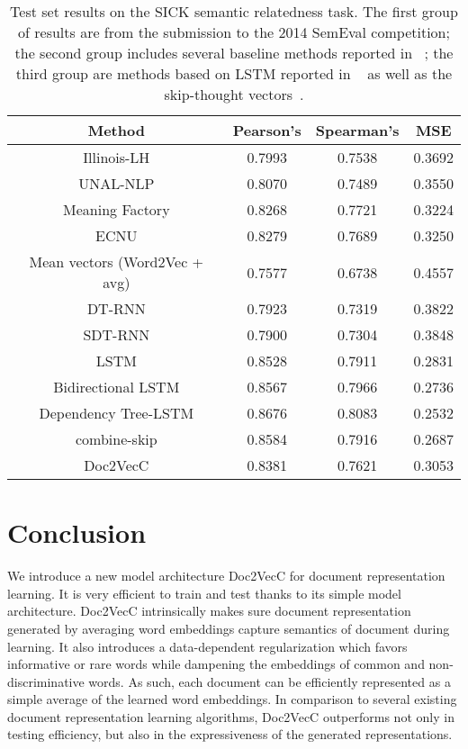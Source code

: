 \documentclass{article} \usepackage{iclr2017_conference,times}
\newcommand{\name}{Doc2VecC}
\begin{document}
\begin{table}
\caption{Test set results on the SICK semantic relatedness task.  The first group of results are from the submission to the 2014 SemEval competition; the second group includes several baseline methods reported in ~\citep{tai2015improved}; the third group are methods based on LSTM reported in ~\citep{tai2015improved} as well as the skip-thought vectors~\citep{kiros2015skip}.}
\label{tbl:sick}
\centering
\begin{tabular}{|c||c|c|c|}
\hline
Method & Pearson's  &  Spearman's  & MSE\\
\hline
\hline
Illinois-LH & 0.7993 & 0.7538 & 0.3692\\
UNAL-NLP & 0.8070 & 0.7489 & 0.3550\\
Meaning Factory & 0.8268 & 0.7721&  0.3224\\
ECNU & 0.8279  & 0.7689 &  0.3250 \\
\hline
Mean vectors (Word2Vec + avg) & 0.7577 & 0.6738 & 0.4557\\
DT-RNN \citep{socher2014grounded} & 0.7923 & 0.7319 & 0.3822\\
SDT-RNN \citep{socher2014grounded}  & 0.7900 & 0.7304 & 0.3848\\
\hline
LSTM \citep{tai2015improved} & 0.8528 & 0.7911 & 0.2831\\
Bidirectional LSTM \citep{tai2015improved} & 0.8567 & 0.7966 & 0.2736\\
Dependency Tree-LSTM \citep{tai2015improved}  & 0.8676 & 0.8083 & 0.2532\\
combine-skip \citep{kiros2015skip} & 0.8584 & 0.7916 & 0.2687\\
\hline
\name & 0.8381 & 0.7621 & 0.3053\\
\hline
\end{tabular}
\end{table}



\section{Conclusion}
We introduce a new model architecture \name{} for document representation learning. It is very efficient to train and test thanks to its simple model architecture. \name{} intrinsically makes sure document representation generated by averaging word embeddings capture semantics of document during learning. It also introduces a data-dependent regularization which favors informative or rare words while dampening the embeddings of common and non-discriminative words. As such, each document can be efficiently represented as a simple average of the learned word embeddings. In comparison to several existing document representation learning algorithms, \name{} outperforms not only in testing efficiency, but also in the expressiveness of the generated representations. 




\end{document}
